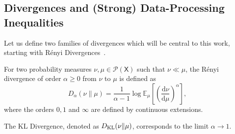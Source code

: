 \documentclass[conference,letterpaper]{IEEEtran}
\def \X{\mathsf X}
\def \calP{\mathcal P}
\newcommand{\renyiDiv}[2]{D_{\alpha}\left(#1\|#2\right)}
\newcommand{\dd}[1]{\mathrm{d}#1}
\newcommand{\mean}[2]{\mathbb{E}_{#1}\left[#2\right]}
\begin{document}
\subsection{Divergences and (Strong) Data-Processing Inequalities}\noindent
Let us define two families of divergences which will be central to this work, starting with R\'enyi Divergences~\cite{van2014renyi}.
\begin{definition}
    For two probability measures $\nu, \mu \in\calP(\X)$ such that $\nu \ll \mu$, the R\'enyi divergence of order $\alpha \geq 0$ from $\nu$ to $\mu$ is defined as 
    \begin{equation*}
        \renyiDiv{\nu}{\mu} = \frac{1}{\alpha - 1}\log\mean{\mu}{\left(\frac{\dd\nu}{\dd\mu}\right)^{\alpha}},
    \end{equation*}
    where the orders $0, 1$ and $\infty$ are defined by continuous extensions.
\end{definition}
The KL Divergence, denoted as $D_{\rm KL}(\nu\|\mu)$, corresponds to the limit $\alpha\to1$.
\end{document}
